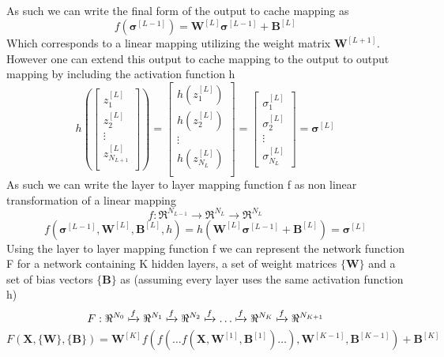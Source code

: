 \documentclass[12pt]{article}
\begin{document}
As such we can write the final form of the output to cache mapping as
\begin{equation}
f\left( \bm{\sigma} ^{[L-1]}\right) = \textbf{W}^{[L]}\bm{\sigma}^{[L-1]}+\textbf{B}^{[L]}
\end{equation}
Which corresponds to a linear mapping utilizing the weight matrix $\textbf{W}^{[L+1]}$. However one can extend this output to cache mapping to the output to output mapping by including the activation function h
\begin{equation}
h
\left(
\begin{bmatrix}
z^{[L]}_1 \\
z^{[L]}_2 \\
\vdots \\
z^{[L]}_{N_{L+1}} \\
\end{bmatrix}
\right)
=	
\begin{bmatrix}
h\left(z^{[L]}_1\right) \\
h\left(z^{[L]}_2 \right) \\
\vdots \\
h\left(z^{[L]}_{N_{L}} \right) \\
\end{bmatrix}
=
\begin{bmatrix}
\sigma^{[L]}_1 \\
\sigma^{[L]}_2 \\
\vdots \\
\sigma^{[L]}_{N_{L}}
\end{bmatrix}
= \bm{\sigma}^{[L]}		 
\end{equation}
As such we can write the layer to layer mapping function f as non linear transformation of a linear mapping
\begin{equation*}
f:\Re^{N_{L-1}}\rightarrow\Re^{N_{L}}\rightarrow\Re^{N_{L}}
\end{equation*}
\begin{equation}
f\left(\bm{\sigma}^{[L-1]}, \textbf{W}^{[L]}, \textbf{B}^{[L]}, h\right) = h\left(\textbf{W}^{[L]}\bm{\sigma}^{[L-1]}+\textbf{B}^{[L]}\right) = \bm{\sigma}^{[L]}
\end{equation}
Using the layer to layer mapping function f we can represent the network function F for a network containing K hidden layers, a set of weight matrices $\{\textbf{W}\}$ and a set of bias vectors $\{\textbf{B}\}$ as (assuming every layer uses the same activation function h)
\begin{equation}\label{network symbolic}
F: \Re^{N_0} \xmapsto{f} \Re^{N_1} \xmapsto{f} \Re^{N_2} \xmapsto{f} \dots \xmapsto{f} \Re^{N_{K}} \xmapsto{f} \Re^{N_{K+1}}
\end{equation}
\begin{equation}\label{network function}
F\left(\textbf{X}, \{\textbf{W}\}, \{\textbf{B}\}\right) = \textbf{W}^{[K]}f\left(f\left(\dots f\left(\textbf{X},\textbf{W}^{[1]}, \textbf{B}^{[1]}\right) \dots \right), \textbf{W}^{[K-1]}, \textbf{B}^{[K-1]}\right) + \textbf{B}^{[K]}
\end{equation} 
\end{document}
